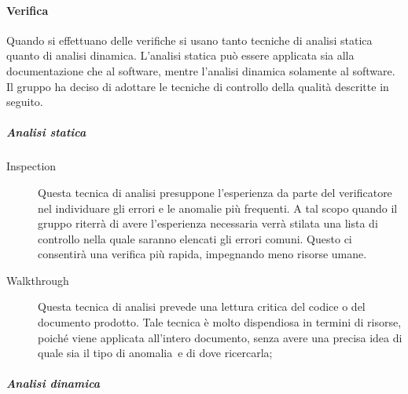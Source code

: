 \documentclass[../PianoDiQualifica.tex]{subfiles}
\begin{document}
				\paragraph{Verifica}
				 Quando si effettuano delle verifiche si usano tanto tecniche di analisi statica quanto di analisi dinamica. L'analisi statica può essere applicata sia alla documentazione che al software\g, mentre l'analisi dinamica solamente al software\g. Il gruppo ha deciso di adottare le tecniche di controllo della qualità descritte in seguito.
				 \subparagraph{Analisi statica}
					\begin{description}
						\item[Inspection] Questa tecnica di analisi presuppone l'esperienza da parte del verificatore nel individuare gli errori e le anomalie più frequenti. A tal scopo quando il gruppo riterrà di avere l'esperienza necessaria verrà stilata una lista di controllo nella quale saranno elencati gli errori comuni. Questo ci consentirà una verifica più rapida, impegnando meno risorse umane.
						\item[Walkthrough] Questa tecnica di analisi prevede una lettura critica del codice o del documento prodotto\g. Tale tecnica è molto dispendiosa in termini di risorse, poiché viene applicata all'intero documento, senza avere una precisa idea di quale sia il tipo di anomalia\g\ e di dove ricercarla;
					\end{description}
					\subparagraph{Analisi dinamica}
\end{document}
